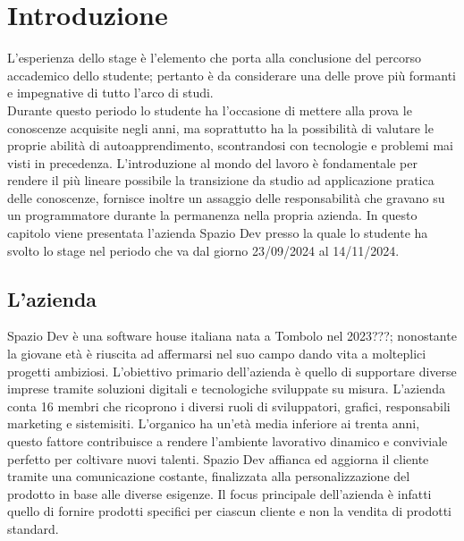 \chapter{Introduzione}
\label{cap:introduzione}

L'esperienza dello stage è l'elemento che porta alla conclusione del percorso accademico dello studente; pertanto è da considerare una delle prove più formanti e impegnative di tutto l'arco di studi.\\
Durante questo periodo lo studente ha l'occasione di mettere alla prova le conoscenze acquisite negli anni, ma soprattutto ha la possibilità di valutare le proprie abilità di autoapprendimento, scontrandosi con tecnologie e problemi mai visti in precedenza. 
L'introduzione al mondo del lavoro è fondamentale per rendere il più lineare possibile la transizione da studio ad applicazione pratica delle conoscenze, fornisce inoltre un assaggio delle responsabilità che gravano su un programmatore durante la permanenza nella propria azienda.
In questo capitolo viene presentata l'azienda Spazio Dev presso la quale lo studente ha svolto lo stage nel periodo che va dal giorno 23/09/2024 al 14/11/2024.

%
%
%
%

\section{L'azienda}
Spazio Dev è una software house italiana nata a Tombolo nel 2023???; nonostante la giovane età è riuscita ad affermarsi nel suo campo dando vita a molteplici progetti ambiziosi. L'obiettivo primario dell'azienda è quello di supportare diverse imprese tramite soluzioni digitali e tecnologiche sviluppate su misura.
L'azienda conta 16 membri che ricoprono i diversi ruoli di sviluppatori, grafici, responsabili marketing e sistemisiti. L'organico ha un'età media inferiore ai trenta anni, questo fattore contribuisce a rendere l'ambiente lavorativo dinamico e conviviale perfetto per coltivare nuovi talenti.
Spazio Dev affianca ed aggiorna il cliente tramite una comunicazione costante, finalizzata alla personalizzazione del prodotto in base alle diverse esigenze. Il focus principale dell'azienda è infatti quello di fornire prodotti specifici per ciascun cliente e non la vendita di prodotti standard.

